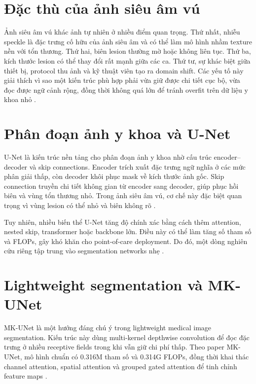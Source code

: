 \documentclass[12pt,a4paper,oneside]{report}
\begin{document}
\section{Đặc thù của ảnh siêu âm vú}

Ảnh siêu âm vú khác ảnh tự nhiên ở nhiều điểm quan trọng. Thứ nhất, nhiễu speckle là đặc trưng cố hữu của ảnh siêu âm và có thể làm mô hình nhầm texture nền với tổn thương. Thứ hai, biên lesion thường mờ hoặc không liên tục. Thứ ba, kích thước lesion có thể thay đổi rất mạnh giữa các ca. Thứ tư, sự khác biệt giữa thiết bị, protocol thu ảnh và kỹ thuật viên tạo ra domain shift. Các yếu tố này giải thích vì sao một kiến trúc phù hợp phải vừa giữ được chi tiết cục bộ, vừa đọc được ngữ cảnh rộng, đồng thời không quá lớn để tránh overfit trên dữ liệu y khoa nhỏ \citep{busi,aumente,mkunet}.

\section{Phân đoạn ảnh y khoa và U-Net}

U-Net là kiến trúc nền tảng cho phân đoạn ảnh y khoa nhờ cấu trúc encoder--decoder và skip connections. Encoder trích xuất đặc trưng ngữ nghĩa ở các mức phân giải thấp, còn decoder khôi phục mask về kích thước ảnh gốc. Skip connection truyền chi tiết không gian từ encoder sang decoder, giúp phục hồi biên và vùng tổn thương nhỏ. Trong ảnh siêu âm vú, cơ chế này đặc biệt quan trọng vì vùng lesion có thể nhỏ và biên không rõ \citep{unet,busi}.

Tuy nhiên, nhiều biến thể U-Net tăng độ chính xác bằng cách thêm attention, nested skip, transformer hoặc backbone lớn. Điều này có thể làm tăng số tham số và FLOPs, gây khó khăn cho point-of-care deployment. Do đó, một dòng nghiên cứu riêng tập trung vào segmentation networks nhẹ \citep{attnunet,unetpp,mkunet}.

\section{Lightweight segmentation và MK-UNet}

MK-UNet là một hướng đáng chú ý trong lightweight medical image segmentation. Kiến trúc này dùng multi-kernel depthwise convolution để đọc đặc trưng ở nhiều receptive fields trong khi vẫn giữ chi phí thấp. Theo paper MK-UNet, mô hình chuẩn có 0.316M tham số và 0.314G FLOPs, đồng thời khai thác channel attention, spatial attention và grouped gated attention để tinh chỉnh feature maps \citep{mkunet}.
\end{document}
